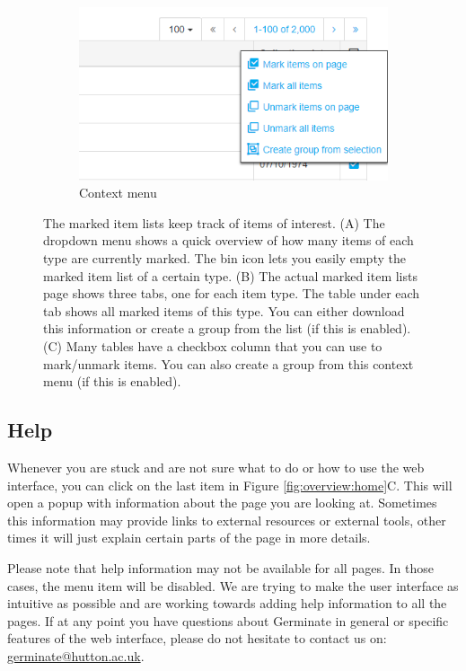 \begin{figure}
	\begin{subfigure}[b]{0.2\linewidth}
		\includegraphics[width=1\linewidth]{img/features/item-list-context-create-group.png}
		\caption{Context menu}
		\label{fig:features:marked-items-context}
	\end{subfigure}
	\caption{The marked item lists keep track of items of interest. (A) The dropdown menu shows a quick overview of how many items of each type are currently marked. The bin icon lets you easily empty the marked item list of a certain type. (B) The actual marked item lists page shows three tabs, one for each item type. The table under each tab shows all marked items of this type. You can either download this information or create a group from the list (if this is enabled). (C) Many tables have a checkbox column that you can use to mark/unmark items. You can also create a group from this context menu (if this is enabled).}
\end{figure}


\subsection{Help}
\label{sec:features:help}

Whenever you are stuck and are not sure what to do or how to use the web interface, you can click on the last item in Figure \ref{fig:overview:home}C. This will open a popup with information about the page you are looking at. Sometimes this information may provide links to external resources or external tools, other times it will just explain certain parts of the page in more details.

Please note that help information may not be available for all pages. In those cases, the menu item will be disabled. We are trying to make the user interface as intuitive as possible and are working towards adding help information to all the pages. If at any point you have questions about Germinate in general or specific features of the web interface, please do not hesitate to contact us on: \href{mailto:germinate@hutton.ac.uk}{germinate@hutton.ac.uk}.